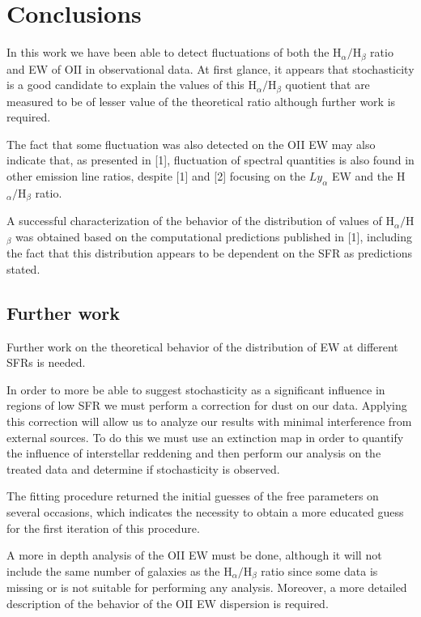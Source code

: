 \chapter{Conclusions}

In this work we have been able to detect fluctuations of both the H$_{\alpha}/$H$_{\beta}$ ratio and EW of OII in observational data. At first
glance, it appears that stochasticity is a good candidate to explain the values of this H$_{\alpha}/$H$_{\beta}$ quotient that are measured to be
of lesser value of the theoretical ratio although further work is required.

The fact that some fluctuation was also detected on the OII EW may also indicate that, as presented in [1], fluctuation of spectral quantities is
also found in other emission line ratios, despite [1] and [2] focusing on the $Ly_{\alpha}$ EW and the H$_{\alpha}/$H$_{\beta}$ ratio.

A successful characterization of the behavior of the distribution of values of H$_{\alpha}/$H$_{\beta}$ was obtained based on the computational
predictions published in [1], including the fact that this distribution appears to be dependent on the SFR as predictions stated.

\section{Further work}

Further work on the theoretical behavior of the distribution of EW at different SFRs is needed.

In order to more be able to suggest stochasticity as a significant influence in regions of low SFR we must perform a correction for dust on our data.
Applying this correction will allow us to analyze our results with minimal interference from external sources. To do this we must use an extinction
map in order to quantify the influence of interstellar reddening and then perform our analysis on the treated data and determine if stochasticity is
observed.

The fitting procedure returned the initial guesses of the free parameters on several occasions, which indicates the necessity to obtain a more educated
guess for the first iteration of this procedure.

A more in depth analysis of the OII EW must be done, although it will not include the same number of galaxies as the H$_{\alpha}/$H$_{\beta}$ ratio
since some data is missing or is not suitable for performing any analysis. Moreover, a more detailed description of the behavior of the OII EW
dispersion is required.
